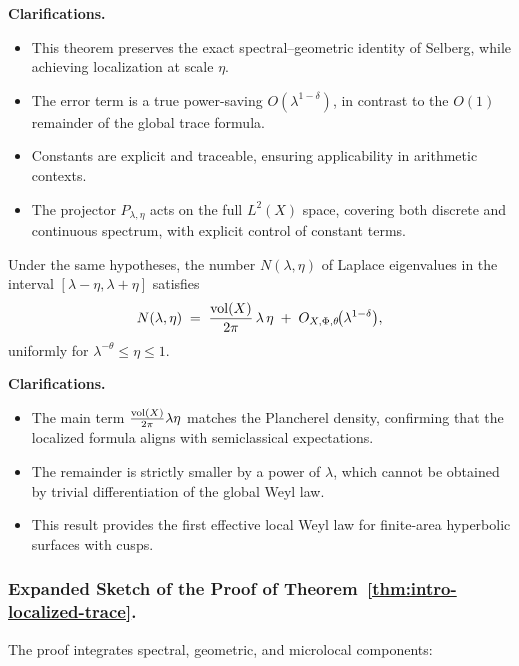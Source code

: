 \noindent\textbf{Clarifications.}
\begin{itemize}
  \item This theorem preserves the exact spectral–geometric identity of Selberg,
        while achieving localization at scale $\eta$.
  \item The error term is a true power-saving $O(\lambda^{1-\delta})$,
        in contrast to the $O(1)$ remainder of the global trace formula.
  \item Constants are explicit and traceable, ensuring applicability in arithmetic contexts.
  \item The projector $P_{\lambda,\eta}$ acts on the full $L^2(X)$ space,
        covering both discrete and continuous spectrum, with explicit control of constant terms.
\end{itemize}

\medskip

\begin{theorem}\label{thm:intro-local-weyl}
Under the same hypotheses,
the number $N(\lambda,\eta)$ of Laplace eigenvalues in the interval
$[\lambda-\eta,\lambda+\eta]$ satisfies
\[
  N(\lambda,\eta)
  \;=\;
  \frac{\operatorname{vol}(X)}{2\pi}\,\lambda\,\eta
  \;+\;
  O_{X,\Phi,\theta}\!\big(\lambda^{1-\delta}\big),
\]
uniformly for $\lambda^{-\theta}\le \eta\le 1$.
\end{theorem}

\medskip

\noindent\textbf{Clarifications.}
\begin{itemize}
  \item The main term $\frac{\operatorname{vol}(X)}{2\pi}\lambda\eta$ matches the Plancherel density,
        confirming that the localized formula aligns with semiclassical expectations.
  \item The remainder is strictly smaller by a power of $\lambda$,
        which cannot be obtained by trivial differentiation of the global Weyl law.
  \item This result provides the first effective local Weyl law for finite-area
        hyperbolic surfaces with cusps.
\end{itemize}

\subsubsection*{Expanded Sketch of the Proof of Theorem~\ref{thm:intro-localized-trace}.}
The proof integrates spectral, geometric, and microlocal components:

